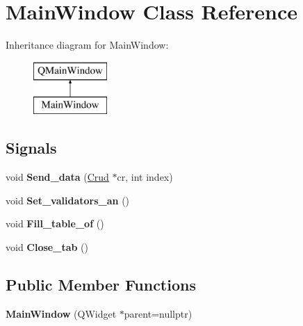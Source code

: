 \hypertarget{class_main_window}{}\section{Main\+Window Class Reference}
\label{class_main_window}
Inheritance diagram for Main\+Window\+:\begin{figure}[H]
\begin{center}
\leavevmode
\includegraphics[height=2.000000cm]{class_main_window}
\end{center}
\end{figure}
\subsection*{Signals}
\begin{DoxyCompactItemize}
\item 
\mbox{\label{class_main_window_a0cfc2a1b54ad9d17966760d4f6b52970}} 
void {\bfseries Send\+\_\+data} (\mbox{\hyperlink{class_crud}{Crud}} $\ast$cr, int index)
\item 
\mbox{\label{class_main_window_afb70522154c9a7a8327741b10509db2f}} 
void {\bfseries Set\+\_\+validators\+\_\+an} ()
\item 
\mbox{\label{class_main_window_afe5176bfd36e8122d5af039fd81a143b}} 
void {\bfseries Fill\+\_\+table\+\_\+of} ()
\item 
\mbox{\label{class_main_window_a9162b617b4f51215aeda3829bb0edc0b}} 
void {\bfseries Close\+\_\+tab} ()
\end{DoxyCompactItemize}
\subsection*{Public Member Functions}
\begin{DoxyCompactItemize}
\item 
\mbox{\label{class_main_window_a996c5a2b6f77944776856f08ec30858d}} 
{\bfseries Main\+Window} (Q\+Widget $\ast$parent=nullptr)
\end{DoxyCompactItemize}
